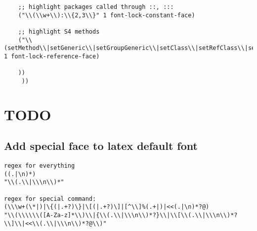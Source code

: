 \documentclass[11pt]{article}
\begin{document}
\begin{verbatim}
	;; highlight packages called through ::, :::
	("\\(\\w+\\):\\{2,3\\}" 1 font-lock-constant-face)

	;; highlight S4 methods
	("\\(setMethod\\|setGeneric\\|setGroupGeneric\\|setClass\\|setRefClass\\|setReplaceMethod\\)" 1 font-lock-reference-face)

	))
	 ))

\end{verbatim}

\section{{\bfseries\sffamily TODO} }
\label{sec:orgb2f277f}
\subsection{Add special face to latex default font}
\label{sec:orgf57b66a}

\begin{verbatim}
regex for everything
((.|\n)*)
"\\(.\\|\\\n\\)*"

regex for special command:
(\\\w+(\*|)|\{(|.+?)\}|\[(|.+?)\]|[^\\]%(.+|)|<<(.|\n)*?@)
"\\(\\\\\\([A-Za-z]*\\)\\|{\\(.\\|\\\n\\)*?}\\|\\[\\(.\\|\\\n\\)*?\\]\\|<<\\(.\\|\\\n\\)*?@\\)"

\end{verbatim}
\end{document}
